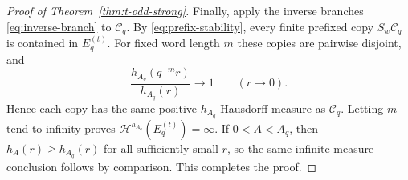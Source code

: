 \documentclass[11pt]{article}
\theoremstyle{remark}
\newcommand{\Haus}{\mathcal{H}}
\newcommand{\Et}{E_q^{(t)}}
\begin{document}
\begin{proof}[Proof of Theorem~\ref{thm:t-odd-strong}]
Finally, apply the inverse branches \eqref{eq:inverse-branch} to
$\mathcal C_q$.  By \eqref{eq:prefix-stability}, every finite
prefixed copy $S_w\mathcal C_q$ is contained in $\Et$.  For fixed
word length $m$ these copies are pairwise disjoint, and
\begin{equation} \label{eq:slow-variation-hA}
 \frac{h_{A_q}(q^{-m}r)}{h_{A_q}(r)}\longrightarrow1
 \qquad(r\to0).
\end{equation}
Hence each copy has the same positive $h_{A_q}$-Hausdorff measure as
$\mathcal C_q$.  Letting $m$ tend to infinity proves
$\Haus^{h_{A_q}}(\Et)=\infty$.  If $0<A<A_q$, then $h_A(r)\geq
h_{A_q}(r)$ for all sufficiently small $r$, so the same infinite
measure conclusion follows by comparison.  This completes the proof.
\end{proof}
\end{document}
